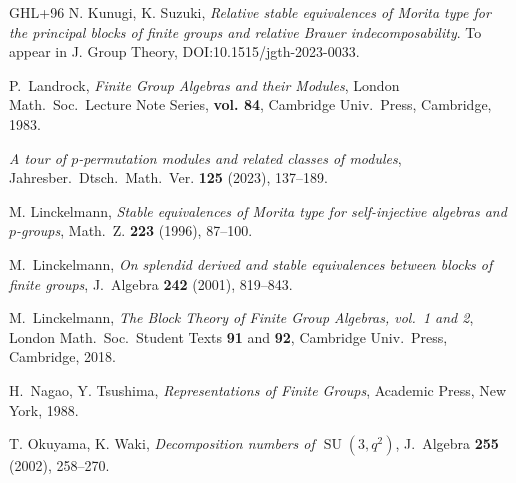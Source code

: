 \documentclass[12pt,a4paper]{amsart}
\theoremstyle{plain}\newtheorem{Theorem}{Theorem}[section]
\theoremstyle{plain}\newtheorem{Conjecture}[Theorem]{Conjecture}
\theoremstyle{plain}\newtheorem{Corollary}[Theorem]{Corollary}
\theoremstyle{plain}\newtheorem{Lemma}[Theorem]{Lemma}
\theoremstyle{plain}\newtheorem{Proposition}[Theorem]{Proposition}
\theoremstyle{definition}\newtheorem{Definition}[Theorem]{Definition}
\theoremstyle{definition}\newtheorem{Example}[Theorem]{Example}
\theoremstyle{definition}\newtheorem{Examples}[Theorem]{Examples}
\theoremstyle{definition}\newtheorem{Remark}[Theorem]{Remark}
\theoremstyle{definition}\newtheorem{Question}[Theorem]{Question}
\theoremstyle{definition}\newtheorem{Notation}[Theorem]{Notation}
\theoremstyle{definition}\newtheorem{Hypothesis}[Theorem]{Hypothesis}
\theoremstyle{definition}\newtheorem{Assumption}[Theorem]{Assumption}
\theoremstyle{definition}\newtheorem{Strategy}[Theorem]{Strategy}
\theoremstyle{definition}\newtheorem{Contents}[Theorem]{Contents}
\theoremstyle{definition}\newtheorem{Computations}[Theorem]{Computations}
\theoremstyle{definition}\newtheorem{Equivalences}[Theorem]{Equivalences}
\theoremstyle{definition}\newtheorem{Notation/Definition}[Theorem]{Notation/Definition}
\theoremstyle{definition}\newtheorem{noth}[Theorem]{}
\theoremstyle{plain}\newtheorem{Step}[Theorem]{Step}
\newcommand{\SU}{\operatorname{SU}}
\begin{document}
\begin{thebibliography}{GHL+96}
{\sc N. Kunugi, K. Suzuki},
\emph{Relative stable equivalences of Morita type for the principal
blocks of finite groups and relative Brauer indecomposability}. 
To appear in J. Group Theory, 
DOI:10.1515/jgth-2023-0033.


 {\sc P.~Landrock},
\emph{Finite Group Algebras and their Modules}, London Math.~Soc.~Lecture Note
Series,
\textbf{vol. 84}, Cambridge Univ.~Press, Cambridge, 1983. 

\emph{A tour of $p$-permutation modules and related classes of modules},
Jahresber.~Dtsch.~Math.~Ver. \textbf{125} (2023), 137--189.


 {\sc M. Linckelmann}, 
\emph{Stable equivalences of Morita type for self-injective algebras and
$p$-groups},
Math.~Z. \textbf{223} (1996), 87--100.


 {\sc M.~Linckelmann}, \emph{On splendid derived and stable
equivalences between blocks of finite groups}, J.~Algebra \textbf{242} (2001),
819--843.

 {\sc M.~Linckelmann}, 
\emph{The Block Theory of Finite Group Algebras, vol.~1 and 2}, 
London Math.~Soc.~Student Texts \textbf{91} and
\textbf{92}, Cambridge Univ.~Press, Cambridge, 2018.



{\sc H.~Nagao, Y. Tsushima},
\emph{Representations of Finite Groups}, Academic Press, New York, 1988.


 {\sc T. Okuyama, K. Waki}, 
\emph{Decomposition numbers of
$\SU(3 ,q^2)$}, J.~Algebra \textbf{255} (2002), 258--270. 



\end{thebibliography}
\end{document}
